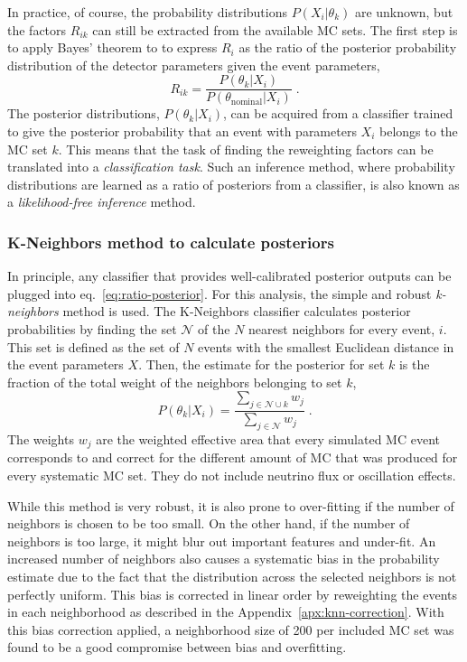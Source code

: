 In practice, of course, the probability distributions $P(X_i|\theta_k)$ are unknown, but the factors $R_{ik}$  can still be extracted from the available MC sets.
The first step is to apply Bayes' theorem to  to express $R_i$ as the ratio of the posterior probability distribution of the detector parameters given the event parameters,
\begin{equation}
    R_{ik} = \frac{P(\theta_k|X_i)}{P(\theta_\mathrm{nominal}|X_i)}\;. \label{eq:ratio-posterior}
\end{equation}
The posterior distributions, $P(\theta_k|X_i)$, can be acquired from a classifier trained to give the posterior probability that an event with parameters $X_i$ belongs to the MC set $k$.
This means that the task of finding the reweighting factors can be translated into a \emph{classification task}.
Such an inference method, where probability distributions are learned as a ratio of posteriors from a classifier, is also known as a \emph{likelihood-free inference} method.

\subsubsection{K-Neighbors method to calculate posteriors}
In principle, any classifier that provides well-calibrated posterior outputs can be plugged into eq.~\ref{eq:ratio-posterior}.
For this analysis, the simple and robust \emph{k-neighbors} method is used.
The K-Neighbors classifier calculates posterior probabilities by finding the set $\mathcal{N}$ of the $N$ nearest neighbors for every event, $i$.
This set is defined as the set of $N$ events with the smallest Euclidean distance in the event parameters $X$.
  Then, the estimate for the posterior for set $k$ is the fraction of the total weight of the neighbors belonging to set $k$,
\begin{equation}
    P(\theta_k|X_i) = \frac{\sum_{j\in{\mathcal{N}\cup k}} w_j }{\sum_{j\in{\mathcal{N}}} w_j}\;. \label{eq:posterior-knn}
\end{equation}
The weights $w_j$ are the weighted effective area that every simulated MC event corresponds to and correct for the different amount of MC that was produced for every systematic MC set.
They do not include neutrino flux or oscillation effects.

While this method is very robust, it is also prone to over-fitting if the number of neighbors is chosen to be too small.
On the other hand, if the number of neighbors is too large, it might blur out important features and under-fit.
An increased number of neighbors also causes a systematic bias in the probability estimate due to the fact that the distribution across the selected neighbors is not perfectly uniform.
This bias is corrected in linear order by reweighting the events in each neighborhood as described in the Appendix~\ref{apx:knn-correction}.
With this bias correction applied, a neighborhood size of 200 per included MC set was found to be a good compromise between bias and overfitting.

